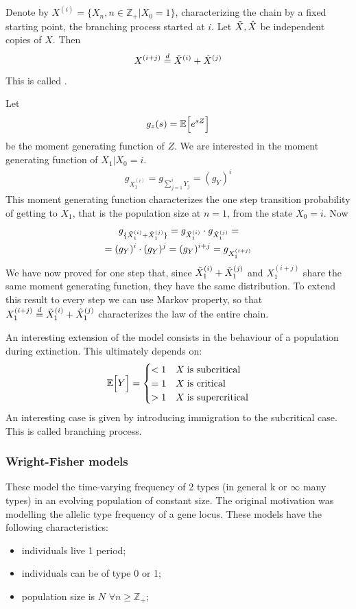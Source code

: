 \documentclass{article}
\begin{document}
\begin{proposition}{}
    Denote by $X^{(i)}=\{{X_n}, n \in \mathbb{Z}_+|X_0=1\}$, characterizing the chain by a fixed starting point, the branching process started at $i$. Let $\Tilde{X},\hat{X}$ be independent copies of $X$. Then
    \begin{equation}
        X^{(i+j)}\stackrel{d}{=}\Tilde{X}^{(i)}+\hat{X}^{(j)}
    \end{equation}
    This is called .
\end{proposition}
\begin{proof2}
    Let 
    \[
    g_{z}(s)=\mathbb{E}\Bigl[{e^{sZ}}\Bigr]
    \]
    be the moment generating function of $Z$. We are interested in the moment generating function of $X_1|X_0=i$.
    \begin{align*}
       g_{X_1^{(i)}}=g_{\sum_{j=1}^{i}Y_j} =(g_Y)^i
    \end{align*} 
    This moment generating function characterizes the one step transition probability of getting to $X_1$, that is the population size at $n=1$, from the state $X_0=i$. Now
    \begin{align*}
         &g_{\{\Tilde{X}_1^{(i)}+\hat{X}_1^{(j)}\}}=g_{\Tilde{X}_1^{(i)}}\cdot g_{\hat{X}_1^{(j)}}=\\
         =(&g_Y)^i\cdot(g_Y)^j=(g_Y)^{i+j}=g_{X_1^{(i+j)}}
    \end{align*}
    We have now proved for one step that, since $\Tilde{X}_1^{(i)}+\hat{X}_1^{(j)}$ and $X_1^{(i+j)}$ share the same moment generating function, they have the same distribution. To extend this result to every step we can use Markov property, so that $X^{(i+j)}_1\stackrel{d}{=}\Tilde{X}^{(i)}_1+\hat{X}^{(j)}_1$ characterizes the law of the entire chain.
\end{proof2}
An interesting extension of the model consists in the behaviour of a population during extinction. This ultimately depends on:
\[
\mathbb{E}\Bigl[{Y}\Bigr]=\begin{cases}
    <1 & X\; \text{is subcritical}\\
    =1 & X\; \text{is critical}\\
    >1 & X\; \text{is supercritical}\\
\end{cases}
\]
An interesting case is given by introducing immigration to the subcritical case. This is called  branching process.
\subsubsection*{Wright-Fisher models}
These model the time-varying frequency of 2 types (in general k or $\infty$ many types) in an evolving population of constant size. The original motivation was modelling the allelic type frequency of a gene locus. These models have the following characteristics:
\begin{itemize}
    \item individuals live 1 period;
    \item individuals can be of type 0 or 1;
    \item population size is $N$ $\forall n \geqslant \mathbb{Z}_+$;
\end{itemize}
\end{document}
